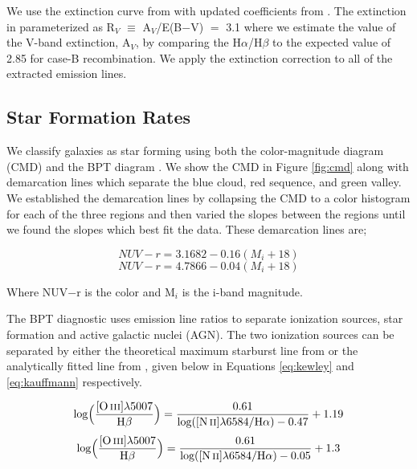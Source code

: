 \documentclass[iop,revtex4,twocolumn,apj,numberedappendix,appendixfloats]{emulateapj}
\begin{document}
We use the extinction curve from \citet{Cardelli:1989} with updated coefficients from \citet{ODonnell:1994}. The extinction in parameterized as R$_V$ $\equiv$ A$_V$/E(B$-$V) $=$ 3.1 where we estimate the value of the V-band extinction, A$_V$, by comparing the H$\alpha$/H$\beta$ to the expected value of 2.85 for case-B recombination. We apply the extinction correction to all of the extracted emission lines.

\subsection{Star Formation Rates}
We classify galaxies as star forming using both the color-magnitude diagram (CMD) and the BPT diagram \citep{Baldwin:1981}. We show the CMD in Figure \ref{fig:cmd} along with demarcation lines which separate the blue cloud, red sequence, and green valley. We established the demarcation lines by collapsing the CMD to a color histogram for each of the three regions and then varied the slopes between the regions until we found the slopes which best fit the data. These demarcation lines are;

\begin{equation}\label{eq:blue}
NUV-r = 3.1682 - 0.16 (M_i+18)
\end{equation}
\begin{equation}\label{eq:red}
NUV-r = 4.7866 - 0.04 (M_i+18)
\end{equation}

Where NUV$-$r is the color and M$_i$ is the i-band magnitude. 

The BPT diagnostic uses emission line ratios to separate ionization sources, star formation and active galactic nuclei (AGN). The two ionization sources can be separated by either the theoretical maximum starburst line from \citet{Kewley:2001} or the analytically fitted line from \citet{Kauffmann:2003}, given below in Equations \ref{eq:kewley} and \ref{eq:kauffmann} respectively.

\begin{equation}\label{eq:kewley}
\rm{log\Big(\frac{[O\,\textsc{iii}]\lambda 5007}{H\beta}\Big) = \frac{0.61}{log([N\,\textsc{ii}]\lambda 6584 / H\alpha) - 0.47} + 1.19}
\end{equation}
\begin{equation}\label{eq:kauffmann}
\rm{log\Big(\frac{[O\,\textsc{iii}]\lambda 5007}{H\beta}\Big) = \frac{0.61}{log([N\,\textsc{ii}]\lambda 6584 / H\alpha) - 0.05} + 1.3}
\end{equation}
\end{document}
